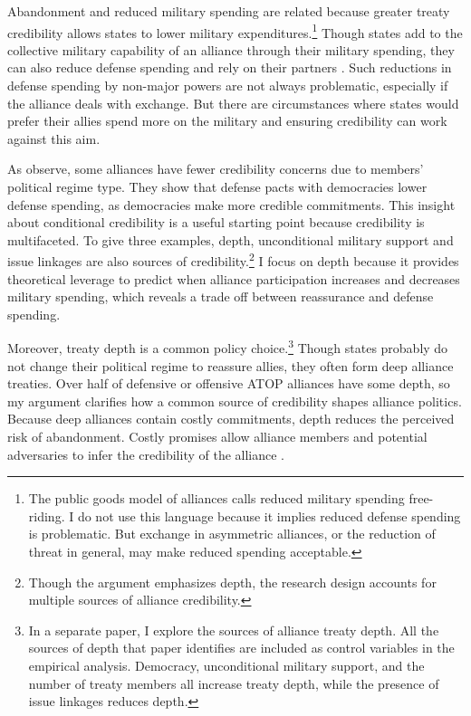 \documentclass[12pt]{article}
\begin{document}
Abandonment and reduced military spending are related because greater treaty credibility allows states to lower military expenditures.\footnote{The public goods model of alliances calls reduced military spending free-riding. I do not use this language because it implies reduced defense spending is problematic. But exchange in asymmetric alliances, or the reduction of threat in general, may make reduced spending acceptable.}
Though states add to the collective military capability of an alliance through their military spending, they can also reduce defense spending and rely on their partners \citep{OlsonZeckhauser1966, Morrow1993, Conybeare1994, SandlerHartley2001}.
Such reductions in defense spending by non-major powers are not always problematic, especially if the alliance deals with exchange. 
But there are circumstances where states would prefer their allies spend more on the military and ensuring credibility can work against this aim. 


As \citet{DigiuseppePoast2016} observe, some alliances have fewer credibility concerns due to members' political regime type.
They show that defense pacts with democracies lower defense spending, as democracies make more credible commitments.
This insight about conditional credibility is a useful starting point because credibility is multifaceted. 
To give three examples, depth, unconditional military support \citep{Benson2012, Chibaetal2015} and issue linkages \citep{LongLeeds2006, Poast2012, Poast2013} are also sources of credibility.\footnote{Though the argument emphasizes depth, the research design accounts for multiple sources of alliance credibility.} 
I focus on depth because it provides theoretical leverage to predict when alliance participation increases and decreases military spending, which reveals a trade off between reassurance and defense spending.  


Moreover, treaty depth is a common policy choice.\footnote{In a separate paper, I explore the sources of alliance treaty depth. All the sources of depth that paper identifies are included as control variables in the empirical analysis. Democracy, unconditional military support, and the number of treaty members all increase treaty depth, while the presence of issue linkages reduces depth.} 
Though states probably do not change their political regime to reassure allies, they often form deep alliance treaties. 
Over half of defensive or offensive ATOP alliances have some depth, so my argument clarifies how a common source of credibility shapes alliance politics. 
Because deep alliances contain costly commitments, depth reduces the perceived risk of abandonment.  
Costly promises allow alliance members and potential adversaries to infer the credibility of the alliance \citep{Leeds2003, FuhrmannSechser2014}. 
\end{document}

